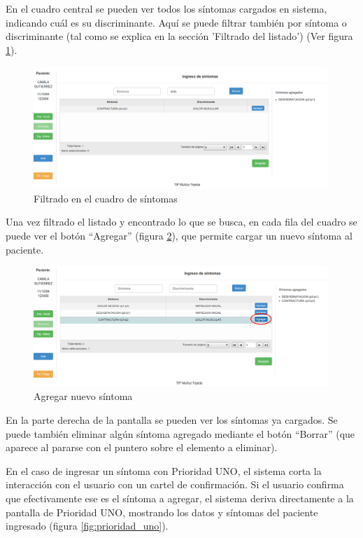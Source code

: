 En el cuadro central se pueden ver todos los síntomas cargados en sistema, indicando cuál es su discriminante. Aquí se puede filtrar también por síntoma o discriminante (tal como se explica en la sección 'Filtrado del listado') (Ver figura \ref{fig:sintomas_filtrar}).
\begin{figure}
\centerline{\includegraphics[width=0.99\textwidth]{sintomas_buscar.png}}
\caption{Filtrado en el cuadro de síntomas} \label{fig:sintomas_filtrar}
\end{figure}
Una vez filtrado el listado y encontrado lo que se busca, en cada fila del cuadro se puede ver el botón ``Agregar'' (figura \ref{fig:sintomas_agregar}), que permite cargar un nuevo síntoma al paciente.
\begin{figure}
\centerline{\includegraphics[width=0.99\textwidth]{sintomas_agregar.png}}
\caption{Agregar nuevo síntoma} \label{fig:sintomas_agregar}
\end{figure}
En la parte derecha de la pantalla se pueden ver los síntomas ya cargados. Se puede también eliminar algún síntoma agregado mediante el botón ``Borrar'' (que aparece al pararse con el puntero sobre el elemento a eliminar).

En el caso de ingresar un síntoma con Prioridad UNO,  el sistema corta la interacción con el usuario con un cartel de confirmación. Si el usuario confirma que efectivamente ese es el síntoma a agregar, el sistema deriva directamente a la pantalla de Prioridad UNO, mostrando los datos y síntomas del paciente ingresado (figura \ref{fig:prioridad_uno}).

